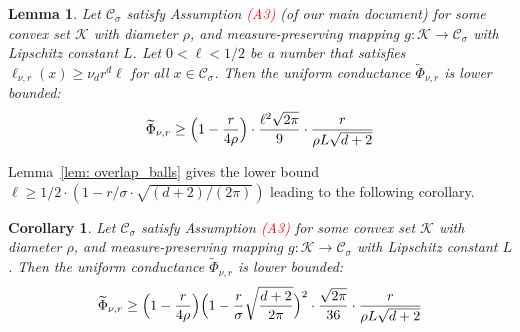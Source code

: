 \documentclass{report}
\newcommand{\1}{\mathbf{1}}
\newcommand{\mc}[1]{\mathcal{#1}}
\theoremstyle{alden}
\theoremstyle{aldenthm}
\newtheorem{lemma}{Lemma}
\newtheorem{corollary}{Corollary}
\theoremstyle{definition}
\theoremstyle{remark}
\begin{document}
\begin{lemma}
	\label{lem: uniform_continuous_conductance}
	Let $\mc{C}_{\sigma}$ satisfy Assumption \textcolor{red}{(A3)} (of our main document) for some convex set $\mathcal{K}$ with diameter $\rho$, and measure-preserving mapping $g: \mathcal{K} \to \mc{C}_{\sigma}$ with Lipschitz constant $L$. Let $0 < \ell < 1/2$ be a number that satisfies $\ell_{\nu,r}(x) \geq \nu_d r^d \ell$ for all $x \in \mc{C}_{\sigma}$.  Then the uniform conductance $\widetilde{\Phi}_{\nu,r}$ is lower bounded:
	\begin{equation*}
	\widetilde{\Phi}_{\nu,r} \geq \Bigl(1 - \frac{r}{4\rho}\Bigr) \cdot\frac{\ell^2\sqrt{2\pi}}{9} \cdot \frac{r}{\rho L \sqrt{d + 2}}
	\end{equation*}
\end{lemma}
Lemma~\ref{lem: overlap_balls} gives the lower bound $\ell \geq 1/2 \cdot (1 - r/\sigma \cdot \sqrt{(d + 2)/(2\pi)})$ leading to the following corollary.
\begin{corollary}
	\label{cor: uniform_continuous_conductance}
	Let $\mc{C}_{\sigma}$ satisfy Assumption \textcolor{red}{(A3)} for some convex set $\mathcal{K}$ with diameter $\rho$, and measure-preserving mapping $g: \mathcal{K} \to \mc{C}_{\sigma}$ with Lipschitz constant $L$. Then the uniform conductance $\widetilde{\Phi}_{\nu,r}$ is lower bounded:
	\begin{equation*}
	\widetilde{\Phi}_{\nu,r} \geq \Bigl(1 - \frac{r}{4\rho}\Bigr) \Bigl(1 - \frac{r}{\sigma}\sqrt{\frac{d + 2}{2\pi}}\Bigr)^2 \cdot \frac{\sqrt{2\pi}}{36} \cdot \frac{r}{\rho L \sqrt{d + 2}}
	\end{equation*}
\end{corollary}
\end{document}

